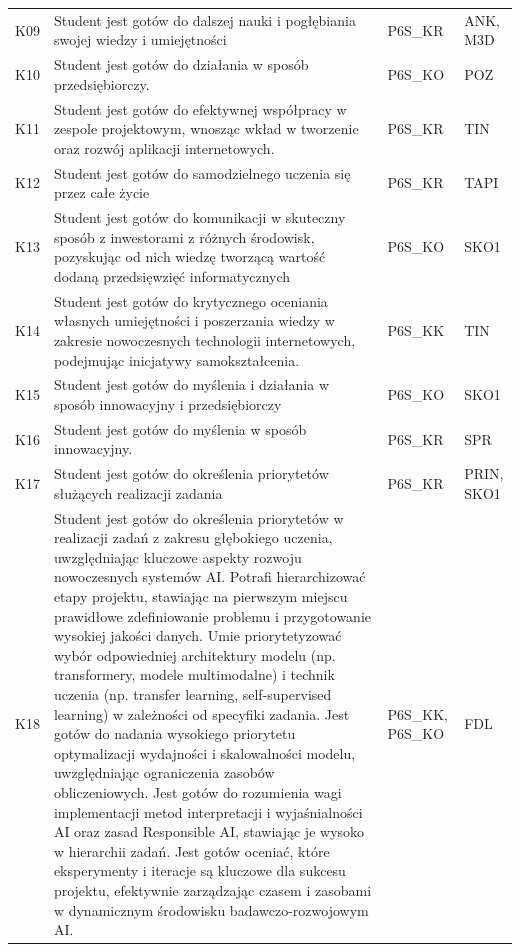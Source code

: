 \documentclass[12pt,a4paper]{article}
\begin{document}
{\begin{longtable}{m{1cm}m{8.8cm}m{2.1cm}m{2.5cm}}
\rowcolor{tableRowLight} K09 & Student jest gotów do dalszej nauki i pogłębiania swojej wiedzy i umiejętności & {\scriptsize P6S\_KR} & {\scriptsize ANK, M3D} \\
\rowcolor{tableRowAlt} K10 & Student jest gotów do działania w sposób przedsiębiorczy. & {\scriptsize P6S\_KO} & {\scriptsize POZ} \\
\rowcolor{tableRowLight} K11 & Student jest gotów do efektywnej współpracy w zespole projektowym, wnosząc wkład w tworzenie oraz rozwój aplikacji internetowych. & {\scriptsize P6S\_KR} & {\scriptsize TIN} \\
\rowcolor{tableRowAlt} K12 & Student jest gotów do samodzielnego uczenia się przez całe życie & {\scriptsize P6S\_KR} & {\scriptsize TAPI} \\
\rowcolor{tableRowLight} K13 & Student jest gotów do komunikacji w skuteczny sposób z inwestorami z różnych środowisk, pozyskując od nich wiedzę tworzącą wartość dodaną przedsięwzięć informatycznych & {\scriptsize P6S\_KO} & {\scriptsize SKO1} \\
\rowcolor{tableRowAlt} K14 & Student jest gotów do krytycznego oceniania własnych umiejętności i poszerzania wiedzy w zakresie nowoczesnych technologii internetowych, podejmując inicjatywy samokształcenia. & {\scriptsize P6S\_KK} & {\scriptsize TIN} \\
\rowcolor{tableRowLight} K15 & Student jest gotów do myślenia i działania w sposób innowacyjny i przedsiębiorczy & {\scriptsize P6S\_KO} & {\scriptsize SKO1} \\
\rowcolor{tableRowAlt} K16 & Student jest gotów do myślenia w sposób innowacyjny. & {\scriptsize P6S\_KR} & {\scriptsize SPR} \\
\rowcolor{tableRowLight} K17 & Student jest gotów do określenia priorytetów służących realizacji zadania & {\scriptsize P6S\_KR} & {\scriptsize PRIN, SKO1} \\
\rowcolor{tableRowAlt} K18 & Student jest gotów do określenia priorytetów w realizacji zadań z zakresu głębokiego uczenia, uwzględniając kluczowe aspekty rozwoju nowoczesnych systemów AI. Potrafi hierarchizować etapy projektu, stawiając na pierwszym miejscu prawidłowe zdefiniowanie problemu i przygotowanie wysokiej jakości danych. Umie priorytetyzować wybór odpowiedniej architektury modelu (np. transformery, modele multimodalne) i technik uczenia (np. transfer learning, self-supervised learning) w zależności od specyfiki zadania. Jest gotów do nadania wysokiego priorytetu optymalizacji wydajności i skalowalności modelu, uwzględniając ograniczenia zasobów obliczeniowych. Jest gotów do rozumienia wagi implementacji metod interpretacji i wyjaśnialności AI oraz zasad Responsible AI, stawiając je wysoko w hierarchii zadań. Jest gotów oceniać, które eksperymenty i iteracje są kluczowe dla sukcesu projektu, efektywnie zarządzając czasem i zasobami w dynamicznym środowisku badawczo-rozwojowym AI. & {\scriptsize P6S\_KK, P6S\_KO} & {\scriptsize FDL} \\

\end{longtable}}
\end{document}
